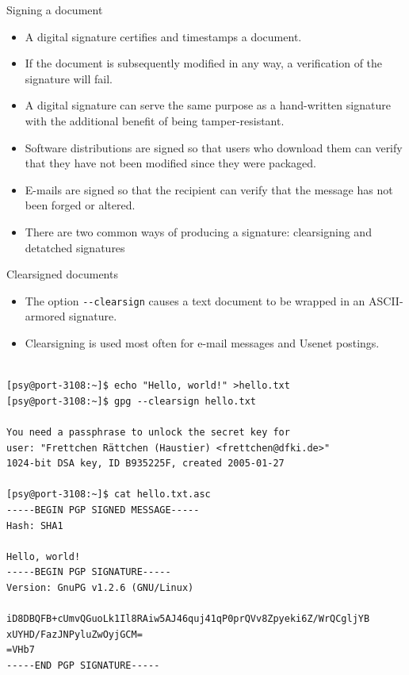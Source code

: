 \documentclass[%
mode=present,%
paper=screen%
]{powerdot}
\newcommand{\clopt}[1]{\texttt{{-}#1}}
\begin{document}
\begin{slide}{Signing a document}
  \begin{itemize}
  \item A digital signature certifies and timestamps a document.
  \item If the document is subsequently modified in any way, a
    verification of the signature will fail.
  \item A digital signature can serve the same purpose as a
    hand-written signature with the additional benefit of being
    tamper-resistant.
  \item Software distributions are signed so that users who download
    them can verify that they have not been modified since they were
    packaged.
  \item E-mails are signed so that the recipient can verify that the
    message has not been forged or altered.
  \item There are two common ways of producing a signature:
    clearsigning and detatched signatures
  \end{itemize}
\end{slide}

\makeatletter\renewcommand{\verbatim@font}{\tiny\tt}\makeatother
\begin{slide}[method=direct]{Clearsigned documents}
  \begin{itemize}
  \item The option \clopt{-clearsign} causes a text document to be
    wrapped in an ASCII-armored signature.
  \item Clearsigning is used most often for e-mail messages and Usenet
    postings.
  \end{itemize}
\begin{verbatim}

[psy@port-3108:~]$ echo "Hello, world!" >hello.txt
[psy@port-3108:~]$ gpg --clearsign hello.txt

You need a passphrase to unlock the secret key for
user: "Frettchen Rättchen (Haustier) <frettchen@dfki.de>"
1024-bit DSA key, ID B935225F, created 2005-01-27

[psy@port-3108:~]$ cat hello.txt.asc
-----BEGIN PGP SIGNED MESSAGE-----
Hash: SHA1

Hello, world!
-----BEGIN PGP SIGNATURE-----
Version: GnuPG v1.2.6 (GNU/Linux)

iD8DBQFB+cUmvQGuoLk1Il8RAiw5AJ46quj41qP0prQVv8Zpyeki6Z/WrQCgljYB
xUYHD/FazJNPyluZwOyjGCM=
=VHb7
-----END PGP SIGNATURE-----
\end{verbatim}%
\end{slide}
\end{document}
